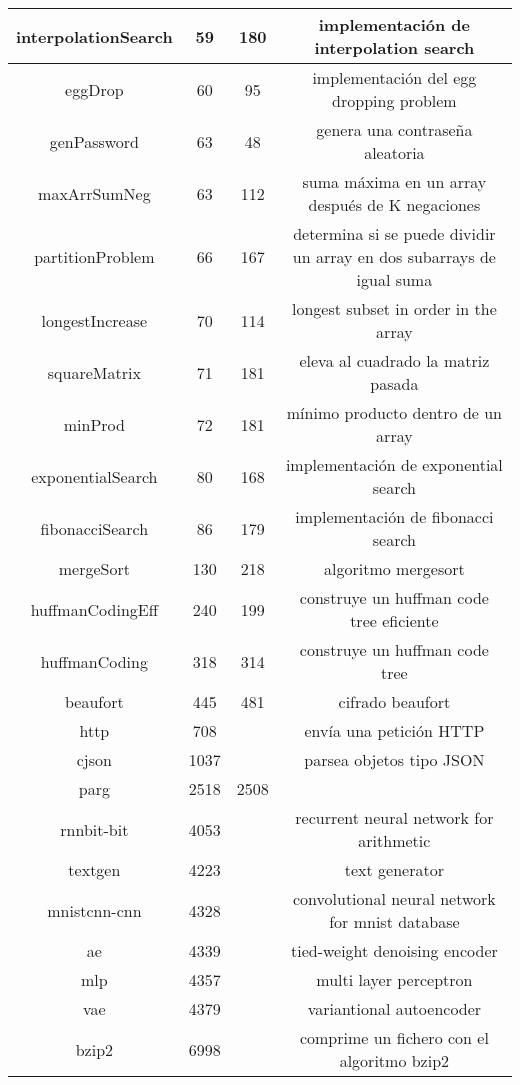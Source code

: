 \documentclass{article}
\begin{document}
\begin{adjustwidth}{-2.5cm}{0cm}
\begin{tabular}{ |c||c|c|c|  }
 interpolationSearch & 59 & 180 & implementación de interpolation search \\ \hline
 eggDrop & 60 & 95 & implementación del egg dropping problem \\ \hline
 genPassword & 63 & 48 & genera una contraseña aleatoria \\ \hline
 maxArrSumNeg & 63 & 112 & suma máxima en un array después de K negaciones \\ \hline
 partitionProblem & 66 & 167 & determina si se puede dividir un array en dos subarrays de igual suma \\ \hline
 longestIncrease & 70 & 114 & longest subset in order in the array \\ \hline
 squareMatrix & 71 & 181 & eleva al cuadrado la matriz pasada \\ \hline
 minProd & 72 & 181 & mínimo producto dentro de un array \\ \hline
 exponentialSearch & 80 & 168 & implementación de exponential search \\ \hline
 fibonacciSearch & 86 & 179 & implementación de fibonacci search \\ \hline
 mergeSort & 130 & 218 & algoritmo mergesort \\ \hline
 huffmanCodingEff & 240 & 199 & construye un huffman code tree eficiente \\ \hline
 huffmanCoding & 318 & 314 & construye un huffman code tree \\ \hline
 beaufort & 445 & 481 & cifrado beaufort \\ \hline
 http & 708 & & envía una petición HTTP \\ \hline
 cjson & 1037 & & parsea objetos tipo JSON \\ \hline
 parg & 2518 & 2508 &  \\ \hline
 rnnbit-bit & 4053 & & recurrent neural network for arithmetic \\ \hline
 textgen & 4223 & & text generator \\ \hline
 mnistcnn-cnn & 4328 & & convolutional neural network for mnist database \\ \hline
 ae & 4339 & & tied-weight denoising encoder \\ \hline
 mlp & 4357 & & multi layer perceptron \\ \hline
 vae & 4379 & & variantional autoencoder \\ \hline
 bzip2 & 6998 & & comprime un fichero con el algoritmo bzip2 \\ 
 \hline
\end{tabular}
\end{adjustwidth}
\end{document}
